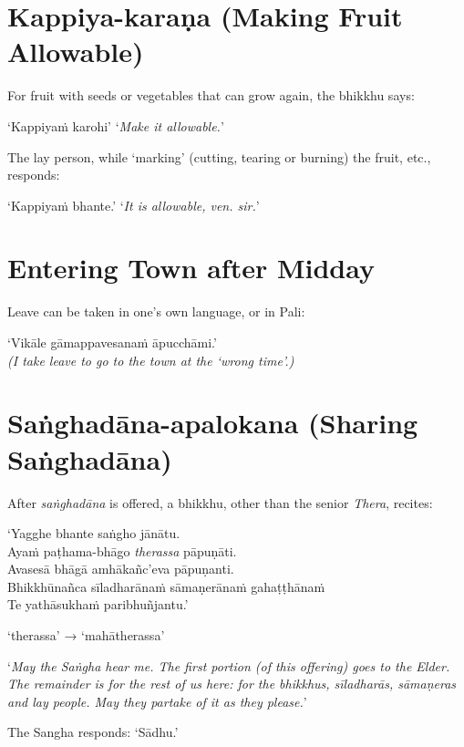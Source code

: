 \section{Kappiya-karaṇa (Making Fruit Allowable)}

For fruit with seeds or vegetables that can grow again, the bhikkhu says:

‘Kappiyaṁ karohi’ ‘\emph{Make it allowable.}’

The lay person, while ‘marking’ (cutting, tearing or burning) the fruit, etc., responds:

‘Kappiyaṁ bhante.’ ‘\emph{It is allowable, ven. sir.}’ 

\section{Entering Town after Midday}

Leave can be taken in one's own language, or in Pali:

‘Vikāle gāmappavesanaṁ āpucchāmi.’\\
\emph{(I take leave to go to the town at the ‘wrong time’.)} 

\section{Saṅghadāna-apalokana (Sharing Saṅghadāna)}

\ifreferenceedition
\enlargethispage{\baselineskip}
\fi

After \emph{saṅghadāna} is offered, a bhikkhu, other than the senior
\emph{Thera}, recites:

\vspace*{\parskip}

‘Yagghe bhante saṅgho jānātu.\\
Ayaṁ paṭhama-bhāgo \emph{therassa} pāpuṇāti.\\
Avasesā bhāgā amhākañc’eva pāpuṇanti.\\
Bhikkhūnañca sīladharānaṁ sāmaṇerānaṁ gahaṭṭhānaṁ\\
Te yathāsukhaṁ paribhuñjantu.’

‘therassa’ → ‘mahātherassa’

‘\emph{May the Saṅgha hear me. The first portion (of this offering) goes to the
  Elder. The remainder is for the rest of us here: for the bhikkhus, sīladharās,
  sāmaṇeras and lay people. May they partake of it as they please.}’

The Sangha responds: ‘Sādhu.’ 

